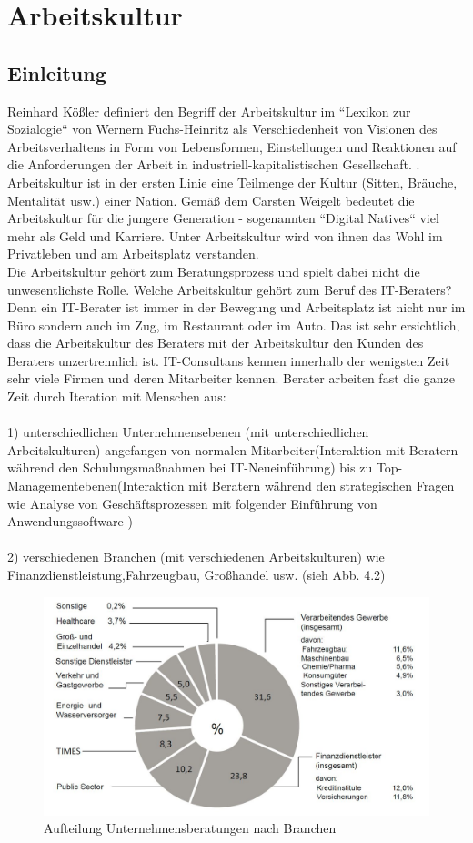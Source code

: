 \section{Arbeitskultur}
	\subsection{Einleitung}
Reinhard Kößler definiert den Begriff der Arbeitskultur im ``Lexikon zur Sozialogie`` von Wernern Fuchs-Heinritz als Verschiedenheit von Visionen des Arbeitsverhaltens in Form von Lebensformen, Einstellungen und Reaktionen auf die Anforderungen der Arbeit in industriell-kapitalistischen Gesellschaft. \cite{Fuchs-HeinritzLautmannRammstedtWienold1994}.
Arbeitskultur ist in der ersten Linie eine Teilmenge der Kultur (Sitten, Bräuche, Mentalität usw.) einer Nation. Gemäß dem Carsten Weigelt bedeutet die Arbeitskultur für die jungere Generation - sogenannten ``Digital Natives`` viel mehr als Geld und Karriere. Unter Arbeitskultur wird von ihnen das Wohl im Privatleben und am Arbeitsplatz verstanden.\\ Die Arbeitskultur gehört zum Beratungsprozess und spielt dabei nicht die unwesentlichste Rolle. Welche Arbeitskultur gehört zum Beruf des IT-Beraters? Denn ein IT-Berater ist immer in der Bewegung und Arbeitsplatz ist nicht nur im Büro sondern auch im Zug, im Restaurant oder im Auto. Das ist sehr ersichtlich, dass die Arbeitskultur des Beraters mit der Arbeitskultur den 
Kunden des Beraters unzertrennlich ist. IT-Consultans kennen innerhalb der wenigsten Zeit sehr viele Firmen und deren Mitarbeiter kennen. Berater arbeiten fast die ganze Zeit durch Iteration mit Menschen aus:\\
\\
1) unterschiedlichen Unternehmensebenen (mit unterschiedlichen Arbeitskulturen) angefangen von normalen Mitarbeiter(Interaktion mit Beratern während den Schulungsmaßnahmen bei IT-Neueinführung) bis zu Top-Managementebenen(Interaktion mit Beratern während den strategischen Fragen wie Analyse von Geschäftsprozessen mit folgender Einführung von Anwendungssoftware ) \\
\\
2) verschiedenen Branchen (mit verschiedenen Arbeitskulturen) wie Finanzdienstleistung,Fahrzeugbau, Großhandel usw. (sieh Abb. 4.2)\\
\begin{figure}[ht]
\centering
\includegraphics[width=10 cm]{./images/Auft_U_Beratung}
\caption{Aufteilung Unternehmensberatungen nach Branchen}
\label{fig:AufteilungUnternehmensberatung}
\end{figure}
